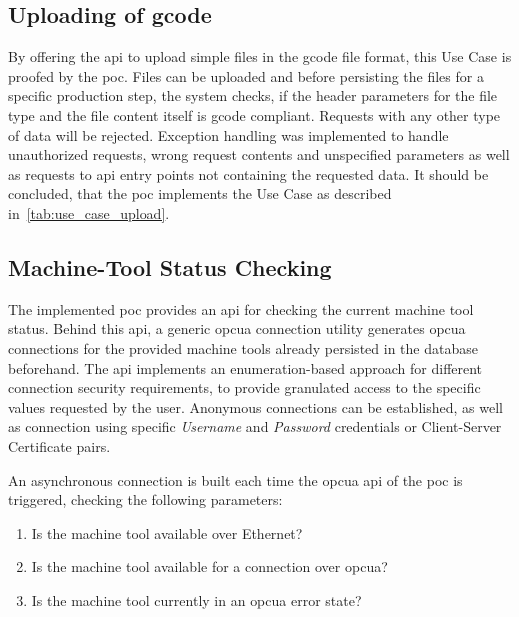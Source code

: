 \documentclass[
a4paper,
twoside,
headsepline,
cleardoublepage=empty,
parskip=half,
draft=false
]{scrbook}
\begin{document}
			\subsection{Uploading of \gls{gcode}}\label{subsec:uploading_g_code}

				By offering the \gls{api} to upload simple files in the \gls{gcode} file format, this Use Case is proofed by the \gls{poc}. Files can be uploaded and before persisting the files for a specific production step, the system checks, if the header parameters for the file type and the file content itself is \gls{gcode} compliant. Requests with any other type of data will be rejected. Exception handling was implemented to handle unauthorized requests, wrong request contents and unspecified parameters as well as requests to \gls{api} entry points not containing the requested data.
				It should be concluded, that the \gls{poc} implements the Use Case as described in~\cref{tab:use_case_upload}.

			\subsection{Machine-Tool Status Checking}\label{subsec:machine_tool_status_checking}

				The implemented \gls{poc} provides an \gls{api} for checking the current machine tool status. Behind this \gls{api}, a generic \gls{opcua} connection utility generates \gls{opcua} connections for the provided machine tools already persisted in the database beforehand. The \gls{api} implements an enumeration-based approach for different connection security requirements, to provide granulated access to the specific values requested by the user. Anonymous connections can be established, as well as connection using specific \textit{Username} and \textit{Password} credentials or Client-Server Certificate pairs.

				An asynchronous connection is built each time the \gls{opcua} \gls{api} of the \gls{poc} is triggered, checking the following parameters:

				\begin{enumerate}
					\item Is the machine tool available over Ethernet?
					\item Is the machine tool available for a connection over \gls{opcua}?
					\item Is the machine tool currently in an \gls{opcua} error state?
				\end{enumerate}
\end{document}
